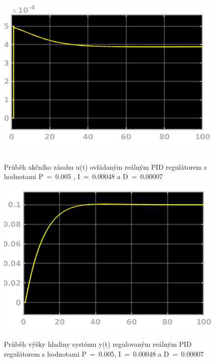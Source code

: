 \documentclass{article}
\begin{document}
\begin{figure}[H]
	   		 \begin{minipage}[b]{.45\textwidth}
    \centering
    \includegraphics[width=\linewidth]{ukol4PIDu}
    \caption{Průběh akčního zásahu u(t) ovládaným reálným PID regulátorem s hodnotami P~=~0.005 , I~=~0.00048 a D~=~0.00007}
  \end{minipage}\hfill
  \begin{minipage}[b]{.45\textwidth}
    \centering
    \includegraphics[width=\linewidth]{ukol4PIDy}
    \caption{Průběh výšky hladiny systému y(t) regulovaným reálným PID regulátorem s hodnotami P~=~0.005, I~=~0.00048 a D~=~0.00007}
    \label{img:hladinaPIDreal}
  \end{minipage}
	   		\end{figure}	
	   		
\end{document}
